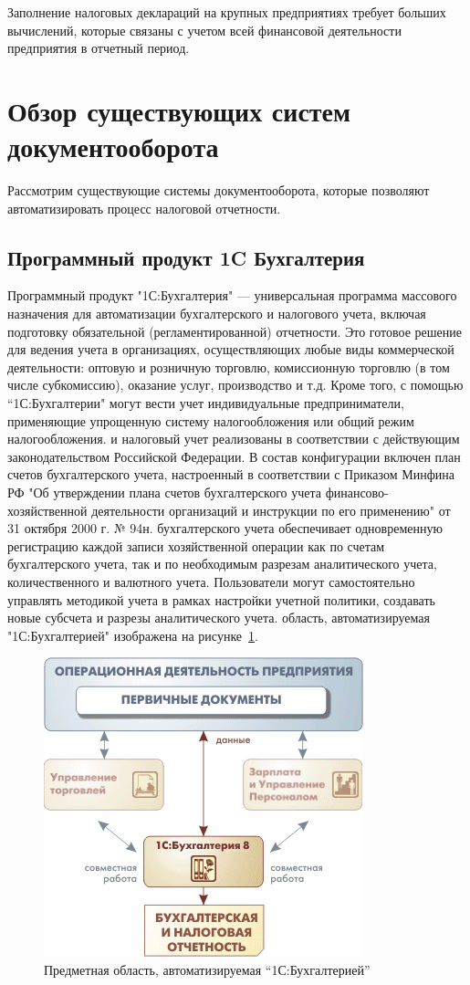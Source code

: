 \documentclass[14pt,a4paper]{reportmod}
\begin{document}
Заполнение налоговых деклараций на крупных предприятиях требует больших вычислений, которые связаны с учетом всей финансовой деятельности предприятия в отчетный период.
\section{Обзор существующих систем документооборота}
Рассмотрим существующие системы документооборота, которые позволяют автоматизировать процесс налоговой отчетности.
\subsection{Программный продукт 1C Бухгалтерия}
Программный продукт "1С:Бухгалтерия" — универсальная программа массового назначения для автоматизации бухгалтерского и налогового учета, включая подготовку обязательной (регламентированной) отчетности. Это готовое решение для ведения учета в организациях, осуществляющих любые виды коммерческой деятельности: оптовую и розничную торговлю, комиссионную торговлю (в том числе субкомиссию), оказание услуг, производство и т.д. Кроме того, с помощью ``1С:Бухгалтерии" могут вести учет индивидуальные предприниматели, применяющие упрощенную систему налогообложения или общий режим налогообложения.
 и налоговый учет реализованы в соответствии с действующим законодательством Российской Федерации. В состав конфигурации включен план счетов бухгалтерского учета, настроенный в соответствии с Приказом Минфина РФ "Об утверждении плана счетов бухгалтерского учета финансово-хозяйственной деятельности организаций и инструкции по его применению" от 31 октября 2000 г. № 94н.
 бухгалтерского учета обеспечивает одновременную регистрацию каждой записи хозяйственной операции как по счетам бухгалтерского учета, так и по необходимым разрезам аналитического учета, количественного и валютного учета. Пользователи могут самостоятельно управлять методикой учета в рамках настройки учетной политики, создавать новые субсчета и разрезы аналитического учета.
 область, автоматизируемая "1С:Бухгалтерией" изображена на рисунке~\ref{pic:1c_image1}.
\begin{figure}
  \centering
  \includegraphics{pics/1c_image1}
  \caption{Предметная область, автоматизируемая ``1С:Бухгалтерией''}
  \label{pic:1c_image1}
\end{figure}
\end{document}
